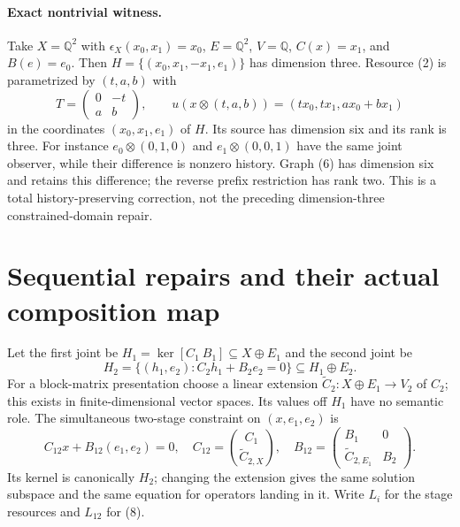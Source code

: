 \documentclass[11pt]{article}
\begin{document}
\paragraph{Exact nontrivial witness.}
Take $X=\mathbb Q^2$ with $\epsilon_X(x_0,x_1)=x_0$, $E=\mathbb Q^2$, $V=\mathbb Q$, $C(x)=x_1$, and $B(e)=e_0$. Then $H=\{(x_0,x_1,-x_1,e_1)\}$ has dimension three. Resource (2) is parametrized by $(t,a,b)$ with
\[
 T=\begin{pmatrix}0&-t\\a&b\end{pmatrix},\qquad
 u(x\otimes(t,a,b))=(tx_0,tx_1,ax_0+bx_1)
\]
in the coordinates $(x_0,x_1,e_1)$ of $H$. Its source has dimension six and its rank is three. For instance $e_0\otimes(0,1,0)$ and $e_1\otimes(0,0,1)$ have the same joint observer, while their difference is nonzero history. Graph (6) has dimension six and retains this difference; the reverse prefix restriction has rank two. This is a total history-preserving correction, not the preceding dimension-three constrained-domain repair.

\section{Sequential repairs and their actual composition map}
Let the first joint be $H_1=\ker[C_1\ B_1]\subseteq X\oplus E_1$ and the second joint be
\[
 H_2=\{(h_1,e_2): C_2h_1+B_2e_2=0\}\subseteq H_1\oplus E_2.
\]
For a block-matrix presentation choose a linear extension $\widetilde C_2:X\oplus E_1\to V_2$ of $C_2$; this exists in finite-dimensional vector spaces. Its values off $H_1$ have no semantic role. The simultaneous two-stage constraint on $(x,e_1,e_2)$ is
\[
 C_{12}x+B_{12}(e_1,e_2)=0,
 \quad C_{12}=\binom{C_1}{\widetilde C_{2,X}},
 \quad B_{12}=\begin{pmatrix}B_1&0\\\widetilde C_{2,E_1}&B_2\end{pmatrix}.\tag{8}
\]
Its kernel is canonically $H_2$; changing the extension gives the same solution subspace and the same equation for operators landing in it. Write $L_i$ for the stage resources and $L_{12}$ for (8).
\end{document}
